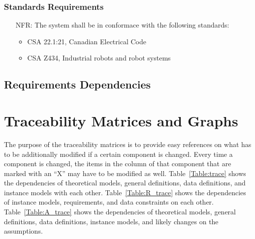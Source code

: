\documentclass[12pt]{article}
\newcounter{nfrnum} %
\begin{document}
\subsubsection{Standards Requirements}
\noindent \begin{itemize}
\item[NFR\refstepcounter{nfrnum}\thenfrnum \label{NFR_Safety1}:] The system shall be in conformace with the following standards:
\begin{itemize}
\item CSA 22.1:21, Canadian Electrical Code \cite{CSA1}
\item CSA Z434, Industrial robots and robot systems \cite{CSA2}
\end{itemize}
\end{itemize}

\subsection{Requirements Dependencies}
\section{Traceability Matrices and Graphs}
\label{sec_tm}

The purpose of the traceability matrices is to provide easy references on what
has to be additionally modified if a certain component is changed.  Every time a
component is changed, the items in the column of that component that are marked
with an ``X'' may have to be modified as well.  Table~\ref{Table:trace} shows the
dependencies of theoretical models, general definitions, data definitions, and
instance models with each other. Table~\ref{Table:R_trace} shows the
dependencies of instance models, requirements, and data constraints on each
other. Table~\ref{Table:A_trace} shows the dependencies of theoretical models,
general definitions, data definitions, instance models, and likely changes on
the assumptions.



\end{document}
